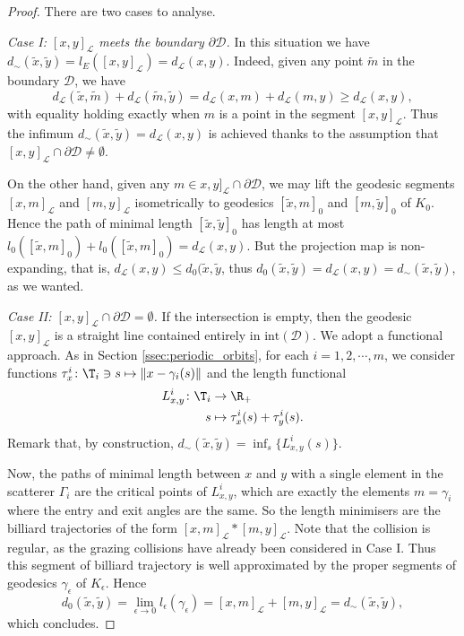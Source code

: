 \documentclass[reqno,11pt]{amsart}
\begin{document}
\begin{proof}
    There are two cases to analyse.
    \par \emph{Case I: \([x,y]_\mathcal{L}\) meets the boundary \(\partial\mathcal{D}\).}
    In this situation we have \(d_\sim(\widetilde x,\widetilde y) = l_E([x,y]_\mathcal{L}) = d_\mathcal{L}(x,y)\).
    Indeed, given any point \( \widetilde m \) in the boundary \(\mathcal{D}\), we have
    \[
        d_\mathcal{L}(\widetilde x, \widetilde m) + d_\mathcal{L}(\widetilde m, \widetilde y) =  d_\mathcal{L}(x, m) + d_\mathcal{L}(m, y) \geq d_\mathcal{L}(x,y),   
    \]
    with equality holding exactly when \( m \) is a point in the segment \([x,y]_\mathcal{L}\).
    Thus the infimum \( d_\sim (\widetilde x, \widetilde y) = d_\mathcal{L}(x, y)\) is achieved thanks to the assumption that \([x,y]_\mathcal{L} \cap \partial\mathcal{D} \neq \emptyset\). 
    \par On the other hand, given any \( m \in x,y]_\mathcal{L} \cap \partial\mathcal{D} \), we may lift the geodesic segments \( [x, m]_\mathcal{L}\) and \( [m, y]_\mathcal{L}\) isometrically to geodesics \( [\widetilde x, m]_0\) and \( [m, \widetilde y]_0 \) of \(K_0\).
    Hence the path of minimal length \( [\widetilde x, \widetilde y]_0 \) has length at most \(l_0([\widetilde x, m]_0) + l_0([\widetilde x, m]_0) = d_\mathcal{L}(x, y) \).
    But the projection map is non-expanding, that is, \(d_\mathcal{L}(x,y) \leq d_0(\widetilde x, \widetilde y \), thus \( d_0(\widetilde x, \widetilde y) = d_\mathcal{L}(x, y) = d_\sim (\widetilde x, \widetilde y)\), as we wanted.
    \par \emph{Case II: \([x,y]_\mathcal{L} \cap \partial\mathcal{D} = \emptyset \).}
    If the intersection is empty, then the geodesic \([x,y]_\mathcal{L}\) is a straight line contained entirely in \( \mathrm{int}(\mathcal{D})\). 
    We adopt a functional approach. 
    As in Section \ref{ssec:periodic_orbits}, for each \( i = 1, 2, \cdots, m \), we consider functions \( \tau^i_x\colon \T_i \ni s \mapsto \|x - \gamma_i(s)\| \) and the length functional
    \begin{align*}
        L_{x,y}^i\colon \T_i &\to \R_+ \\
        s &\mapsto \tau^i_x(s) + \tau^i_y(s).
    \end{align*}
    Remark that, by construction, \(d_\sim(\widetilde x, \widetilde y) = \inf_s\{L_{x,y}^i(s)\}\).
    \par Now, the paths of minimal length between \(x\) and \(y\) with a single element in the scatterer \( \Gamma_i \) are the critical points of \( L_{x,y}^i \), which are exactly the elements \( m = \gamma_i \) where the entry and exit angles are the same.
    So the length minimisers are the billiard trajectories of the form \([x,m]_\mathcal{L} \ast [m, y]_\mathcal{L}\).
    Note that the collision is regular, as the grazing collisions have already been considered in Case I.
    Thus this segment of billiard trajectory is well approximated by the proper segments of geodesics \( \gamma_\epsilon \) of \( K_\epsilon \).
    Hence 
    \[
        d_0(\widetilde x, \widetilde y) = \lim_{\epsilon \to 0}l_\epsilon (\gamma_\epsilon) = [x,m]_\mathcal{L} + [m, y]_\mathcal{L} = d_\sim(\widetilde x, \widetilde y),
    \]
    which concludes.
\end{proof}
\end{document}

